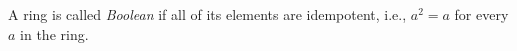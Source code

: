A ring is called \emph{Boolean} if all of its elements are idempotent, i.e., $a^2 = a$ for every $a$ in the ring.
